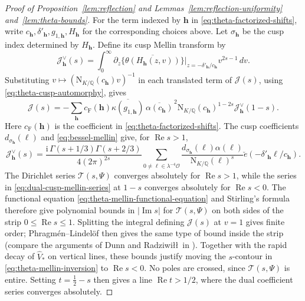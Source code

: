 \documentclass[11pt,a4paper]{article}
\numberwithin{equation}{section}
\numberwithin{figure}{section}
\theoremstyle{definition}
\theoremstyle{remark}
\newcommand{\Q}{\mathbb Q}
\newcommand{\NK}{\mathrm N_{K/\Q}}
\newcommand{\OO}{\mathcal O}
\newcommand{\Rea}{\operatorname{Re}}
\newcommand{\dd}{\,d}
\begin{document}
\begin{proof}[Proof of Proposition~\ref{lem:reflection} and Lemmas~\ref{lem:reflection-uniformity} and~\ref{lem:theta-bounds}]
For the term indexed by $\boldsymbol h$ in \eqref{eq:theta-factorized-shifts},
write $c_{\boldsymbol h},\delta'_{\boldsymbol h},g_{1,\boldsymbol h},H_{\boldsymbol h}$ for the corresponding choices above.
Let $\sigma_{\boldsymbol h}$ be the cusp index determined by $H_{\boldsymbol h}$.
Define its cusp Mellin transform by
\begin{equation}\label{eq:dual-cusp-mellin}
 \mathcal J_{\boldsymbol h}^\vee(s)=\int_0^\infty
 \partial_z\bigl\{\overline{\theta(H_{\boldsymbol h}(z,v))}\bigr\}
 \Bigr|_{z=-\delta'_{\boldsymbol h}/c_{\boldsymbol h}}v^{2s-1}\dd v.
\end{equation}
Substituting $v\mapsto(\NK(c_{\boldsymbol h})v)^{-1}$ in each translated term
of $\mathcal J(s)$, using \eqref{eq:theta-cusp-automorphy}, gives
\begin{equation}\label{eq:theta-mellin-functional-equation}
 \mathcal J(s)=-\sum_{\boldsymbol h} c_{\mathrm F}(\boldsymbol h)\overline{\kappa(g_{1,\boldsymbol h})}\,
       \overline{\alpha(c_{\boldsymbol h})}^{\,2}\NK(c_{\boldsymbol h})^{1-2s}\mathcal J_{\boldsymbol h}^\vee(1-s).
\end{equation}
Here $c_{\mathrm F}(\boldsymbol h)$ is the coefficient in \eqref{eq:theta-factorized-shifts}.
The cusp coefficients $d_{\sigma_{\boldsymbol h}}(\ell)$ and \eqref{eq:bessel-mellin}
give, for $\Rea s>1$,
\begin{equation}\label{eq:dual-cusp-mellin-series}
 \mathcal J_{\boldsymbol h}^\vee(s)=\frac{\mathrm i\,\Gamma(s+1/3)\Gamma(s+2/3)}{4(2\pi)^{2s}}
 \sum_{0\ne\ell\in\lambda^{-4}\OO}
 \frac{d_{\sigma_{\boldsymbol h}}(\ell)\alpha(\ell)}{\NK(\ell)^s}
 \breve e(-\delta'_{\boldsymbol h}\ell/c_{\boldsymbol h}).
\end{equation}
The Dirichlet series $\mathcal T(s,\Psi)$ converges absolutely
for $\Rea s>1$, while the series in \eqref{eq:dual-cusp-mellin-series}
at $1-s$ converges absolutely for $\Rea s<0$. The functional
equation \eqref{eq:theta-mellin-functional-equation} and Stirling's
formula \cite[\S5.A.4]{IK04} therefore give polynomial bounds in
$|\operatorname{Im}s|$ for $\mathcal T(s,\Psi)$ on both sides of
the strip $0\le\Rea s\le1$.
Splitting the integral defining $\mathcal J(s)$ at $v=1$ gives finite order;
Phragm\'en--Lindel\"of \cite[Theorem~5.53]{IK04} then gives the same
type of bound inside the strip (compare the arguments of Dunn and Radziwi\l\l\ in
\cite[Propositions~5.1--5.2]{DR}).
Together with the rapid decay of $\widehat V_*$ on vertical lines,
these bounds justify moving the $s$-contour in
\eqref{eq:theta-mellin-inversion} to $\Rea s<0$. No poles are crossed,
since $\mathcal T(s,\Psi)$ is entire. Setting $t=\tfrac12-s$
then gives a line $\Rea t>1/2$, where the dual coefficient series
converges absolutely.


\end{proof}
\end{document}
